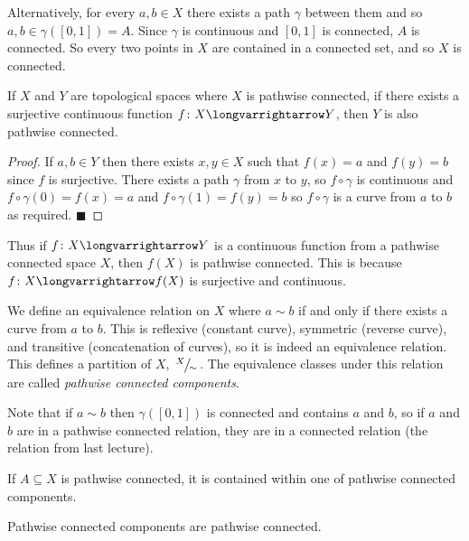 \documentclass[10pt]{article}
\def\qed{\hskip1cm\penalty-100\hbox{}\hfill$\blacksquare$}
\def\longto{\longvarrightarrow}
\begin{document}
Alternatively, for every $a,b\in X$ there exists a path $\gamma$ between them and so $a,b\in\gamma([0,1])=A$.
Since $\gamma$ is continuous and $[0,1]$ is connected, $A$ is connected.
So every two points in $X$ are contained in a connected set, and so $X$ is connected.

\begin{prop*}

    If $X$ and $Y$ are topological spaces where $X$ is pathwise connected, if there exists a surjective continuous function $f\colon X\longto Y$, then $Y$ is also pathwise connected.

\end{prop*}

\begin{proof}

    If $a,b\in Y$ then there exists $x,y\in X$ such that $f(x)=a$ and $f(y)=b$ since $f$ is surjective.
    There exists a path $\gamma$ from $x$ to $y$, so $f\circ\gamma$ is continuous and $f\circ\gamma(0)=f(x)=a$ and $f\circ\gamma(1)=f(y)=b$ so $f\circ\gamma$ is a curve from $a$ to $b$ as required.
    \qed

\end{proof}

Thus if $f\colon X\longto Y$ is a continuous function from a pathwise connected space $X$, then $f(X)$ is pathwise connected.
This is because $f\colon X\longto f(X)$ is surjective and continuous.

We define an equivalence relation on $X$ where $a\sim b$ if and only if there exists a curve from $a$ to $b$.
This is reflexive (constant curve), symmetric (reverse curve), and transitive (concatenation of curves), so it is indeed an equivalence relation.
This defines a partition of $X$, $\slfrac X\sim$.
The equivalence classes under this relation are called \emph{pathwise connected components}.

Note that if $a\sim b$ then $\gamma([0,1])$ is connected and contains $a$ and $b$, so if $a$ and $b$ are in a pathwise connected relation, they are in a connected relation (the relation from last lecture).

\begin{prop*}

    \benum
        \item If $A\subseteq X$ is pathwise connected, it is contained within one of pathwise connected components.
        \item Pathwise connected components are pathwise connected.
    \eenum

\end{prop*}
\end{document}
